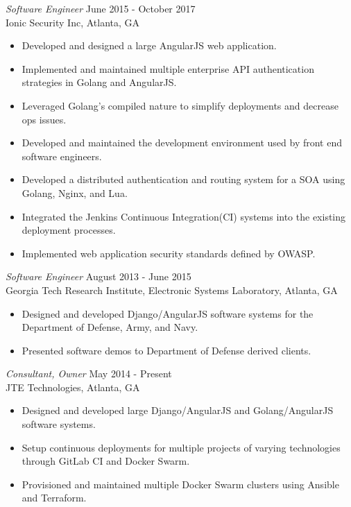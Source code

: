 \documentclass[margin, 10pt]{res} %
\begin{document}
\begin{resume}
        {\sl Software Engineer} \hfill June 2015 - October 2017 \\
        Ionic Security Inc, Atlanta, GA
        \begin{itemize}
            \item Developed and designed a large AngularJS web application.
            \item Implemented and maintained multiple enterprise API authentication strategies in Golang and AngularJS.
            \item Leveraged Golang's compiled nature to simplify deployments and decrease ops issues.
            \item Developed and maintained the development environment used by front end software engineers.
            \item Developed a distributed authentication and routing system for a SOA using Golang, Nginx, and Lua.
            \item Integrated the Jenkins Continuous Integration(CI) systems into the existing deployment processes.
            \item Implemented web application security standards defined by OWASP.
        \end{itemize}

        {\sl Software Engineer} \hfill August 2013 - June 2015 \\
        Georgia Tech Research Institute, Electronic Systems Laboratory, Atlanta, GA
        \begin{itemize} \itemsep -2pt %
        \item Designed and developed Django/AngularJS software systems for the Department of Defense, Army, and Navy.
        \item Presented software demos to Department of Defense derived clients.
        \end{itemize}

        {\sl Consultant, Owner} \hfill May 2014 - Present\\
        JTE Technologies, Atlanta, GA
        \begin{itemize}
            \item Designed and developed large Django/AngularJS and Golang/AngularJS software systems.
            \item Setup continuous deployments for multiple projects of varying technologies through GitLab CI and Docker Swarm.
            \item Provisioned and maintained multiple Docker Swarm clusters using Ansible and Terraform.
        \end{itemize}



\end{resume}
\end{document}
